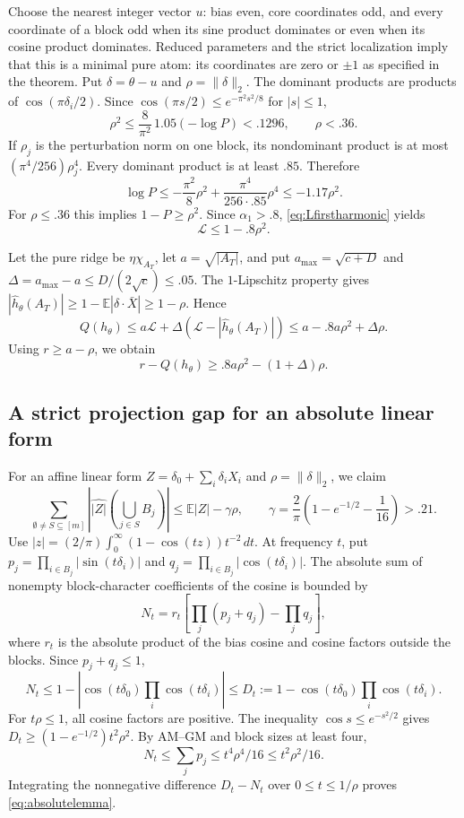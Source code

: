 \documentclass[11pt]{article}
\newcommand{\E}{\mathbb E}
\begin{document}
Choose the nearest integer vector $u$: bias even, core coordinates
odd, and every coordinate of a block odd when its sine product
dominates or even when its cosine product dominates. Reduced
parameters and the strict localization imply that this is a minimal
pure atom: its coordinates are zero or $\pm1$ as specified in the
theorem. Put $\delta=\theta-u$ and $\rho=\|\delta\|_2$. The dominant
products are products of $\cos(\pi\delta_i/2)$. Since
$\cos(\pi s/2)\le e^{-\pi^2s^2/8}$ for $|s|\le1$,
\[
 \rho^2\le\frac8{\pi^2}\,1.05(-\log P)<.1296,
 \qquad \rho<.36.
\]
If $\rho_j$ is the perturbation norm on one block, its nondominant
product is at most $(\pi^4/256)\rho_j^4$. Every dominant product is
at least $.85$. Therefore
\[
 \log P\le-\frac{\pi^2}{8}\rho^2
          +\frac{\pi^4}{256\cdot.85}\rho^4
          \le-1.17\rho^2.
\]
For $\rho\le.36$ this implies $1-P\ge\rho^2$. Since
$\alpha_1>.8$, \eqref{eq:Lfirstharmonic} yields
\begin{equation}\label{eq:localquadratic}
 \mathcal L\le1-.8\rho^2.
\end{equation}

Let the pure ridge be $\eta\chi_{A_T}$, let $a=\sqrt{|A_T|}$, and
put $a_{\max}=\sqrt{c+D}$ and
$\Delta=a_{\max}-a\le D/(2\sqrt c)\le.05$.
The $1$-Lipschitz property gives
$|\widehat h_\theta(A_T)|\ge1-\E|\delta\cdot\bar X|\ge1-\rho$.
Hence
\[
 Q(h_\theta)\le a\mathcal L+
       \Delta(\mathcal L-|\widehat h_\theta(A_T)|)
       \le a-.8a\rho^2+\Delta\rho.
\]
Using $r\ge a-\rho$, we obtain
\begin{equation}\label{eq:quadraticdeficit}
 r-Q(h_\theta)\ge .8a\rho^2-(1+\Delta)\rho.
\end{equation}

\subsection{A strict projection gap for an absolute linear form}

For an affine linear form $Z=\delta_0+\sum_i\delta_iX_i$ and
$\rho=\|\delta\|_2$, we claim
\begin{equation}\label{eq:absolutelemma}
 \sum_{\emptyset\ne S\subseteq[m]}
       \left|\widehat{|Z|}\!\left(\bigcup_{j\in S}B_j\right)\right|
       \le\E|Z|-\gamma\rho,
 \qquad
 \gamma=\frac2\pi\left(1-e^{-1/2}-\frac1{16}\right)>.21.
\end{equation}
Use
$|z|=(2/\pi)\int_0^\infty(1-\cos(tz))t^{-2}\,dt$.
At frequency $t$, put
$p_j=\prod_{i\in B_j}|\sin(t\delta_i)|$ and
$q_j=\prod_{i\in B_j}|\cos(t\delta_i)|$.
The absolute sum of nonempty block-character coefficients of the
cosine is bounded by
\[
 N_t=r_t\left[\prod_j(p_j+q_j)-\prod_jq_j\right],
\]
where $r_t$ is the absolute product of the bias cosine and cosine
factors outside the blocks. Since $p_j+q_j\le1$,
\[
 N_t\le1-|\cos(t\delta_0)\prod_i\cos(t\delta_i)|
 \le D_t:=1-\cos(t\delta_0)\prod_i\cos(t\delta_i).
\]
For $t\rho\le1$, all cosine factors are positive. The inequality
$\cos s\le e^{-s^2/2}$ gives
$D_t\ge(1-e^{-1/2})t^2\rho^2$. By AM--GM and block sizes at least
four,
\[
 N_t\le\sum_jp_j\le t^4\rho^4/16\le t^2\rho^2/16.
\]
Integrating the nonnegative difference $D_t-N_t$ over
$0\le t\le1/\rho$ proves \eqref{eq:absolutelemma}.
\end{document}
